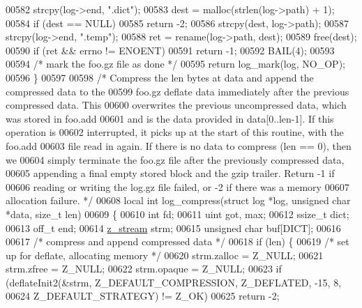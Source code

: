 \begin{DoxyCode}
00582     strcpy(log->end, \textcolor{stringliteral}{".dict"});
00583     dest = malloc(strlen(log->path) + 1);
00584     \textcolor{keywordflow}{if} (dest == NULL)
00585         \textcolor{keywordflow}{return} -2;
00586     strcpy(dest, log->path);
00587     strcpy(log->end, \textcolor{stringliteral}{".temp"});
00588     ret = rename(log->path, dest);
00589     free(dest);
00590     \textcolor{keywordflow}{if} (ret && errno != ENOENT)
00591         \textcolor{keywordflow}{return} -1;
00592     BAIL(4);
00593 
00594     \textcolor{comment}{/* mark the foo.gz file as done */}
00595     \textcolor{keywordflow}{return} log\_mark(log, NO\_OP);
00596 \}
00597 
00598 \textcolor{comment}{/* Compress the len bytes at data and append the compressed data to the}
00599 \textcolor{comment}{   foo.gz deflate data immediately after the previous compressed data.  This}
00600 \textcolor{comment}{   overwrites the previous uncompressed data, which was stored in foo.add}
00601 \textcolor{comment}{   and is the data provided in data[0..len-1].  If this operation is}
00602 \textcolor{comment}{   interrupted, it picks up at the start of this routine, with the foo.add}
00603 \textcolor{comment}{   file read in again.  If there is no data to compress (len == 0), then we}
00604 \textcolor{comment}{   simply terminate the foo.gz file after the previously compressed data,}
00605 \textcolor{comment}{   appending a final empty stored block and the gzip trailer.  Return -1 if}
00606 \textcolor{comment}{   reading or writing the log.gz file failed, or -2 if there was a memory}
00607 \textcolor{comment}{   allocation failure. */}
00608 local \textcolor{keywordtype}{int} log\_compress(\textcolor{keyword}{struct} log *log, \textcolor{keywordtype}{unsigned} \textcolor{keywordtype}{char} *data, \textcolor{keywordtype}{size\_t} len)
00609 \{
00610     \textcolor{keywordtype}{int} fd;
00611     uint got, max;
00612     ssize\_t dict;
00613     off\_t end;
00614     \hyperlink{structz__stream__s}{z\_stream} strm;
00615     \textcolor{keywordtype}{unsigned} \textcolor{keywordtype}{char} buf[DICT];
00616 
00617     \textcolor{comment}{/* compress and append compressed data */}
00618     \textcolor{keywordflow}{if} (len) \{
00619         \textcolor{comment}{/* set up for deflate, allocating memory */}
00620         strm.zalloc = Z\_NULL;
00621         strm.zfree = Z\_NULL;
00622         strm.opaque = Z\_NULL;
00623         \textcolor{keywordflow}{if} (deflateInit2(&strm, Z\_DEFAULT\_COMPRESSION, Z\_DEFLATED, -15, 8,
00624                          Z\_DEFAULT\_STRATEGY) != Z\_OK)
00625             \textcolor{keywordflow}{return} -2;

\end{DoxyCode}
